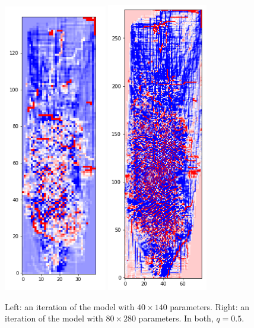 \documentclass[11pt]{article}
\begin{document}
\begin{figure}[!h]
\centering
\includegraphics[width=0.4\textwidth]{91.png}
\includegraphics[width=0.39\textwidth]{large.png}
\caption{Left: an iteration of the model with $40 \times 140$ parameters. Right: an iteration of the model with $80\times 280$ parameters. In both, $q=0.5$.}
\label{larger}
\end{figure}
\end{document}
